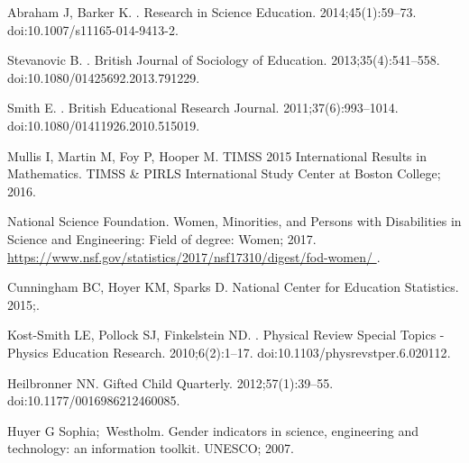 \begin{thebibliography}{10}

Abraham J, Barker K.
.
\newblock Research in Science Education. 2014;45(1):59--73.
\newblock doi:{10.1007/s11165-014-9413-2}.

Stevanovic B.
.
\newblock British Journal of Sociology of Education. 2013;35(4):541--558.
\newblock doi:{10.1080/01425692.2013.791229}.

Smith E.
.
\newblock British Educational Research Journal. 2011;37(6):993--1014.
\newblock doi:{10.1080/01411926.2010.515019}.

Mullis I, Martin M, Foy P, Hooper M. TIMSS 2015 International Results in
  Mathematics. TIMSS \& PIRLS International Study Center at Boston College;
  2016.

{National Science Foundation}. Women, Minorities, and Persons with Disabilities
  in Science and Engineering: Field of degree: Women; 2017.
\newblock \url{https://www.nsf.gov/statistics/2017/nsf17310/digest/fod-women/
  }.

Cunningham BC, Hoyer KM, Sparks D.
\newblock National Center for Education Statistics. 2015;.

Kost-Smith LE, Pollock SJ, Finkelstein ND.
.
\newblock Physical Review Special Topics - Physics Education Research.
  2010;6(2):1--17.
\newblock doi:{10.1103/physrevstper.6.020112}.

Heilbronner NN.
\newblock Gifted Child Quarterly. 2012;57(1):39--55.
\newblock doi:{10.1177/0016986212460085}.

Huyer G Sophia;~Westholm.
\newblock Gender indicators in science, engineering and technology: an
  information toolkit.
\newblock UNESCO; 2007.


\end{thebibliography}
